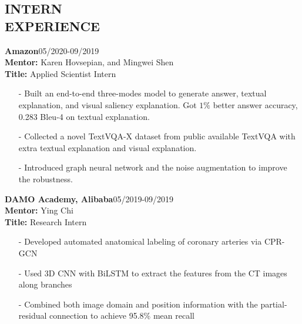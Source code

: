 \documentclass[margin]{res}
\begin{document}
\begin{resume}
\vspace{-1em}
\section{INTERN \\ EXPERIENCE}
                \textbf{Amazon}\hfill 05/2020-09/2019\\
                \textbf{Mentor:} Karen Hovsepian, and Mingwei Shen\\
                \textbf{Title:} Applied Scientist Intern
                \begin{itemize}\itemsep -2.2pt %
                \item[-] Built an end-to-end three-modes model to generate answer, textual explanation, and visual saliency explanation. Got $1\%$ better answer accuracy, 0.283 Bleu-4 on textual explanation.
                 \item[-] Collected a novel TextVQA-X dataset from public available TextVQA with extra textual explanation and visual explanation.
                 \item[-] Introduced graph neural network and the noise augmentation to improve the robustness.
                 \end{itemize}
                 
                \textbf{DAMO Academy, Alibaba}\hfill 05/2019-09/2019\\
                \textbf{Mentor:} Ying Chi\\
                \textbf{Title:} Research Intern
                \begin{itemize}\itemsep -2.2pt %
                 \item[-] Developed automated anatomical labeling of coronary arteries via CPR-GCN
                 \item[-] Used 3D CNN with BiLSTM to extract the features from the CT images along branches
                 \item[-] Combined both image domain and position information with the partial-residual connection to achieve 95.8\% mean recall
                 \end{itemize}

\vspace{-1em}

\end{resume}
\end{document}
